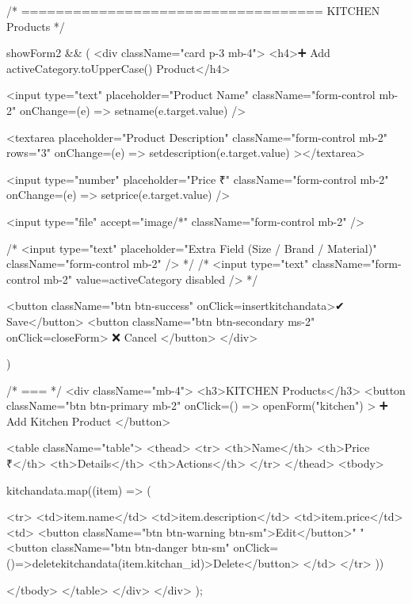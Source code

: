 {      {/* =================================== KITCHEN Products */}
      {showForm2 && (
        <div className="card p-3 mb-4">
          <h4>➕ Add {activeCategory.toUpperCase()} Product</h4>

          <input
            type="text"
            placeholder="Product Name"
            className="form-control mb-2" onChange={(e) => setname(e.target.value)}
          />

          <textarea
            placeholder="Product Description"
            className="form-control mb-2"
            rows="3" onChange={(e) => setdescription(e.target.value)}
          ></textarea>

          <input
            type="number"
            placeholder="Price ₹"
            className="form-control mb-2" onChange={(e) => setprice(e.target.value)}
          />

          <input
            type="file"
            accept="image/*"
            className="form-control mb-2"
          />


          {/* <input
                type="text"
                placeholder="Extra Field (Size / Brand / Material)"
                className="form-control mb-2"
              /> */}
          {/* 
                  <input
                    type="text"
                    className="form-control mb-2"
                    value={activeCategory}
                    disabled
                  /> */}

          <button className="btn btn-success" onClick={insertkitchandata}>✔ Save</button>
          <button className="btn btn-secondary ms-2" onClick={closeForm}>
            ❌ Cancel
          </button>
        </div>

      )}
      {/* === */}
      <div className="mb-4">
        <h3>KITCHEN Products</h3>
        <button
          className="btn btn-primary mb-2"
          onClick={() => openForm("kitchen")}
        >
          ➕ Add Kitchen Product
        </button>

        <table className="table">
          <thead>
            <tr>
              <th>Name</th>
              <th>Price ₹</th>
              <th>Details</th>
              <th>Actions</th>
            </tr>
          </thead>
          <tbody>
            {kitchandata.map((item) => (

              <tr>
                <td>{item.name}</td>
                <td>{item.description}</td>
                <td>{item.price}</td>
                <td>
                  <button className="btn btn-warning btn-sm">Edit</button>{" "}
                  <button className="btn btn-danger btn-sm" onClick={()=>deletekitchandata(item.kitchan_id)}>Delete</button>
                </td>
              </tr>
            ))}
          </tbody>
        </table>
      </div>
    </div>
  );
}

